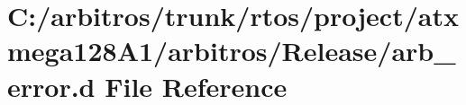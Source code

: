 \hypertarget{rtos_2project_2atxmega128_a1_2arbitros_2_release_2arb__error_8d}{\section{C\-:/arbitros/trunk/rtos/project/atxmega128\-A1/arbitros/\-Release/arb\-\_\-error.d File Reference}
\label{rtos_2project_2atxmega128_a1_2arbitros_2_release_2arb__error_8d}
}
